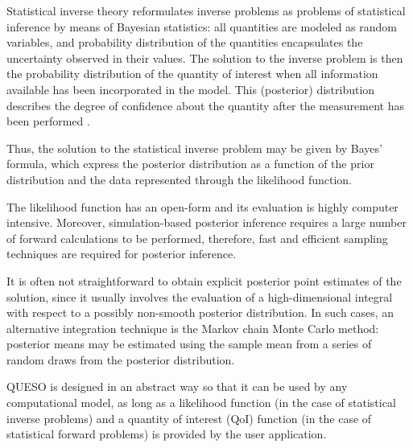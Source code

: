 
Statistical inverse theory reformulates inverse problems as problems of statistical inference by means of Bayesian statistics: all quantities are modeled as random variables, and probability distribution of the quantities encapsulates the uncertainty observed in their values. The solution to the inverse problem is then the probability distribution of the quantity of interest when all information available has been incorporated in the model. This (posterior) distribution describes the degree of confidence about the quantity after the measurement has been performed \cite{KaSo05}.

Thus, the solution to the statistical inverse problem may be given by Bayes' formula, which express the posterior distribution as a function of the prior distribution and the data represented through the likelihood function.

The likelihood function has an open-form and its evaluation is highly computer intensive.  Moreover, simulation-based posterior inference requires a large number of forward calculations to be performed, therefore, fast and efficient sampling techniques are required for posterior inference.

It is often not straightforward to obtain explicit posterior point estimates of the solution, since it usually involves the evaluation of a high-dimensional integral with respect to a possibly non-smooth posterior distribution. In such cases, an alternative integration technique is the Markov chain Monte Carlo method: posterior means may be estimated using the sample mean from a series of random draws from the posterior distribution.

QUESO is designed in an abstract way so that it can be used by any computational model, as long as a likelihood function (in the case of statistical inverse problems) and a quantity of interest (QoI) function (in the case of statistical forward problems) is provided by the user application.

